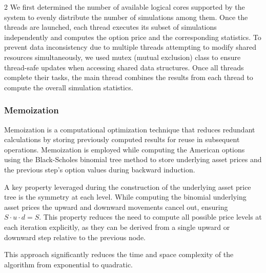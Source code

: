 \begin{multicols}{2}
We first determined the number of available logical cores supported by the system to evenly distribute the number of simulations among them. Once the threads are launched, each thread executes its subset of simulations independently and computes the option price and the corresponding statistics. To prevent data inconsistency due to multiple threads attempting to modify shared resources simultaneously, we used mutex (mutual exclusion) class to ensure thread-safe updates when accessing shared data structures. Once all threads complete their tasks, the main thread combines the results from each thread to compute the overall simulation statistics.
\subsubsection{Memoization}
Memoization is a computational optimization technique that reduces redundant calculations by storing previously computed results for reuse in subsequent operations. Memoization is employed while computing the American options using the Black-Scholes binomial tree method to store underlying asset prices and the previous step's option values during backward induction.

A key property leveraged during the construction of the underlying asset price tree is the symmetry at each level. While computing the binomial underlying asset prices the upward and downward movements cancel out, ensuring $S \cdot u \cdot d = S$. This property reduces the need to compute all possible price levels at each iteration explicitly, as they can be derived from a single upward or downward step relative to the previous node.

This approach significantly reduces the time and space complexity of the algorithm from exponential to quadratic.
\end{multicols}